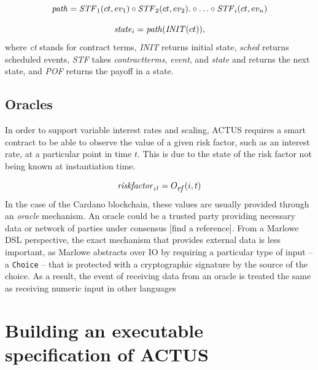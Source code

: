 \documentclass[runningheads]{llncs}
\newcommand{\ident}[1]{\mbox{\emph{#1}}}
\begin{document}
\newcommand{\STF}{\ident{STF}}
\noindent 
\begin{equation}
\ident{path}=\STF_{1}(ct,ev_{1})\circ \STF_{2}(ct,ev_{2}).\circ\ldots\circ \STF_{i}(ct,ev_{n})
\end{equation}

\noindent 
\begin{equation}
\ident{state}_{i}=\ident{path}(\ident{INIT}(ct)),
\end{equation}
\noindent
where \emph{ct} stands for contract terms, \emph{INIT} returns initial state, \emph{sched}
returns scheduled events, \emph{STF} takes \emph{contractterms}, \emph{event}, and \emph{state}
and returns the next state, and \emph{POF} returns the payoff in a state.

\subsection{Oracles}

In order to support variable interest rates and scaling, ACTUS requires
a smart contract to be able to observe the value of a given risk factor,
such as an interest rate, at a particular point in time $t$. This is due to the state of the risk factor not being known at instantiation
time. 

\noindent 
\begin{equation}
\ident{riskfactor}_{i}{}_{t}=O_{\footnotesize\ident{rf}}(i,t)
\end{equation}
\noindent
In the case of the Cardano blockchain, these values are usually
provided through an \emph{oracle} mechanism\cite{oracles}. An oracle
could be a trusted party providing necessary data or network of parties
under consensus {[}find a reference{]}. 
From a Marlowe DSL perspective,
the exact mechanism that provides external data is less important,
as Marlowe abstracts over IO by requiring a particular type of input -- a 
\texttt{Choice} -- that is protected with a cryptographic signature by the source of the choice.
As a result, the event of receiving data from an oracle is treated the
same as receiving numeric input in other languages

\section{Building an executable specification of ACTUS}
\label{executable}
\end{document}
